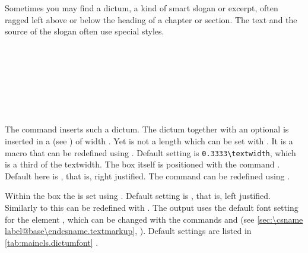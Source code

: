 Sometimes you may find a dictum, a kind of smart slogan or excerpt, often ragged
left above or below the heading of a chapter or section. The text and the
source of the slogan often use special styles.


\begin{Declaration}
  \\
  \\
  \\
  \\
  \\
  \\
\end{Declaration}%
%
%
%
%
%
%
%
The command  inserts such a dictum.
%
The dictum together with an optional  is inserted in a
 (see \cite{latex:usrguide}) of width
. Yet  is not a length which can be set
with . It is a macro that can be redefined using
. Default setting is \verb;0.3333\textwidth;, which is a
third of the textwidth. The box itself is positioned with the command
. Default here is ,
that is, right justified.  The command  can be redefined
using .

Within the box the  is set using .
Default setting is , that is, left
justified. Similarly to  this can be redefined with
.  The output uses the default font setting for the
element , which can be changed with the commands
 and  (see \autoref{sec:\csname
  label@base\endcsname.textmarkup}, ). Default settings are listed in
\autoref{tab:maincls.dictumfont}%
%
.

